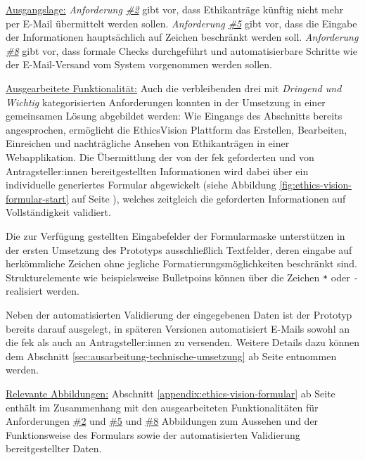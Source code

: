 \documentclass[a4paper,12pt,twoside]{scrreprt}
\begin{document}
\noindent\underline{Ausgangslage:} \textit{Anforderung \hyperref[sub-sub-sec:abgeleitete-anforderungen-während-erstellung-einreichung]{\#2}} gibt vor, dass Ethikanträge künftig nicht mehr per E-Mail übermittelt werden sollen. \textit{Anforderung \hyperref[sub-sub-sec:abgeleitete-anforderungen-während-erstellung-einreichung]{\#5}} gibt vor, dass die Eingabe der Informationen hauptsächlich auf Zeichen beschränkt werden soll. \textit{Anforderung \hyperref[sub-sub-sec:abgeleitete-anforderungen-nach-einreichung]{\#8}} gibt vor, dass formale Checks durchgeführt und automatisierbare Schritte wie der E-Mail-Versand vom System vorgenommen werden sollen.

\medskip

\noindent\underline{Ausgearbeitete Funktionalität:} Auch die verbleibenden drei mit \textit{Dringend und Wichtig} kategorisierten Anforderungen konnten in der Umsetzung in einer gemeinsamen Lösung abgebildet werden: Wie Eingangs des Abschnitts bereits angesprochen, ermöglicht die EthicsVision Plattform das Erstellen, Bearbeiten, Einreichen und nachträgliche Ansehen von Ethikanträgen in einer Webapplikation. Die Übermittlung der von der \ac{fek} geforderten und von Antragsteller:innen bereitgestellten Informationen wird dabei über ein individuelle generiertes Formular abgewickelt (siehe Abbildung \ref{fig:ethics-vision-formular-start} auf Seite \pageref{fig:ethics-vision-formular-start}), welches zeitgleich die geforderten Informationen auf Vollständigkeit validiert.

Die zur Verfügung gestellten Eingabefelder der Formularmaske unterstützen in der ersten Umsetzung des Prototyps ausschließlich Textfelder, deren eingabe auf herkömmliche Zeichen ohne jegliche Formatierungsmöglichkeiten beschränkt sind. Strukturelemente wie beispielsweise Bulletpoins können über die Zeichen \texttt{*} oder \texttt{-} realisiert werden.

Neben der automatisierten Validierung der eingegebenen Daten ist der Prototyp bereits darauf ausgelegt, in späteren Versionen automatisiert E-Mails sowohl an die \acl{fek} als auch an Antragsteller:innen zu versenden. Weitere Details dazu können dem Abschnitt \ref{sec:ausarbeitung-technische-umsetzung} ab Seite \pageref{sec:ausarbeitung-technische-umsetzung} entnommen werden.

\medskip

\noindent\underline{Relevante Abbildungen:} Abschnitt \ref{appendix:ethics-vision-formular} ab Seite \pageref{appendix:ethics-vision-formular} enthält im Zusammenhang mit den ausgearbeiteten Funktionalitäten für Anforderungen \hyperref[sub-sub-sec:abgeleitete-anforderungen-vorfeld-antrag]{\#2} und \hyperref[sub-sub-sec:abgeleitete-anforderungen-während-erstellung-einreichung]{\#5} und \hyperref[sub-sub-sec:abgeleitete-anforderungen-nach-einreichung]{\#8} Abbildungen zum Aussehen und der Funktionsweise des Formulars sowie der automatisierten Validierung bereitgestellter Daten.
\end{document}
